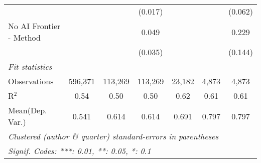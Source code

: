 \begin{tabular}{lcccccc}
                           &               &               & (0.017)       &              &               & (0.062)\\   
   No AI Frontier - Method &               &               & 0.049         &              &               & 0.229\\   
                           &               &               & (0.035)       &              &               & (0.144)\\   
   \midrule
   \emph{Fit statistics}\\
   Observations            & 596,371       & 113,269       & 113,269       & 23,182       & 4,873         & 4,873\\  
   R$^2$                   & 0.54          & 0.50          & 0.50          & 0.62         & 0.61          & 0.61\\  
Mean(Dep. Var.) & 0.541 & 0.614 & 0.614 & 0.691 & 0.797 & 0.797 \\
   \midrule \midrule
   \multicolumn{7}{l}{\emph{Clustered (author \& quarter) standard-errors in parentheses}}\\
   \multicolumn{7}{l}{\emph{Signif. Codes: ***: 0.01, **: 0.05, *: 0.1}}\\
\end{tabular}
\par\endgroup
